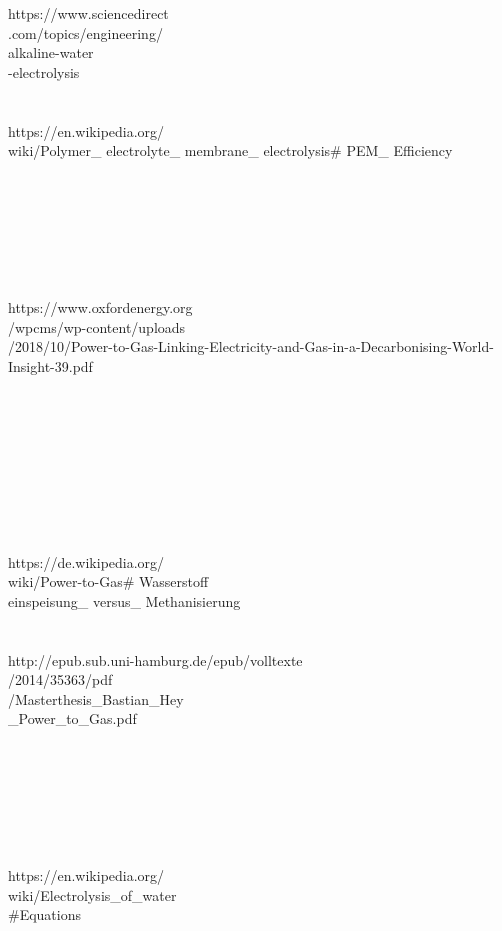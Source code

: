 \begin{parcolumns}[colwidths={1=2.5 cm, 2=10 cm, 3=2.5 cm}]{3}
{https://www.sciencedirect\\.com/topics/engineering/\\alkaline-water\\-electrolysis
\\ \\ \\
https://en.wikipedia.org/\\wiki/Polymer\_ electrolyte\_ membrane\_ electrolysis\# PEM\_ Efficiency
\\ \\ \\ \\ \\ \\ \\ \\
https://www.oxfordenergy.org\\/wpcms/wp-content/uploads\\/2018/10/Power-to-Gas-Linking-Electricity-and-Gas-in-a-Decarbonising-World-Insight-39.pdf
\\ \\ \\ \\ \\ 
\\ \\ \\ \\ \\
https://de.wikipedia.org/\\wiki/Power-to-Gas\# Wasserstoff\\einspeisung\_ versus\_ Methanisierung
\\ \\ \\ 
http://epub.sub.uni-hamburg.de/epub/volltexte\\/2014/35363/pdf\\/Masterthesis\_Bastian\_Hey \\
\_Power\_to\_Gas.pdf
\\ \\ \\ \\ \\ \\ \\ \\ 
https://en.wikipedia.org/\\wiki/Electrolysis\_of\_water \\ 
\#Equations
\\ \\ \\ \\ \\ \\ \\ \\ \\ \\ \\ \\ \\ \\ \\
}
\end{parcolumns}
